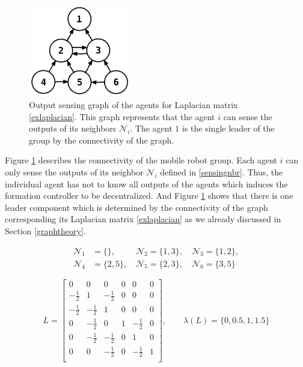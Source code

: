\documentclass[11pt, a4paper, oneside, openany, reqno]{book}
\theoremstyle{definition}
\theoremstyle{remark}
\numberwithin{equation}{chapter} %
\newcommand{\NBR}{\mathcal{N}}
\begin{document}
\begin{figure}[htp]
	\centering
	\includegraphics[width=0.40\textwidth]{laplacian.png}
	\caption{Output sensing graph of the agents for Laplacian matrix \eqref{exlaplacian}.
	This graph represents that the agent $ i $ can sense the outputs of its neighbors $ \NBR_i $.
	The agent $ 1 $ is the single leader of the group by the connectivity of the graph.}
	\label{connect}
\end{figure}

Figure \ref{connect} describes the connectivity of the mobile robot group.
Each agent $ i $ can only sense the outputs of its neighbor $ \NBR_i $ defined in \eqref{sensingnbr}.
Thus, the individual agent has not to know all outputs of the agents 
which induces the formation controller to be decentralized.
And Figure \ref{connect} shows that there is one leader component which is determined
by the connectivity of the graph corresponding its Laplacian matrix \eqref{exlaplacian}
as we already discussed in Section \ref{graphtheory}.

\begin{equation}\begin{split}\label{sensingnbr}
	\NBR_1 &= \lbrace \rbrace, \quad\quad\;\,
	\NBR_2 = \lbrace1, 3 \rbrace, \quad \NBR_3 = \lbrace 1, 2\rbrace,\\
	\NBR_4 &= \lbrace 2, 5\rbrace, \quad	
	\NBR_5 = \lbrace 2, 3\rbrace, \quad	\NBR_6 = \lbrace 3, 5\rbrace
\end{split}\end{equation}

\begin{equation}\label{exlaplacian}
	L=\left[ \begin{array}{cccccc } 
	0 & 0 & 0 & 0 & 0 & 0 \\
	-\frac{1}{2} & 1 & -\frac{1}{2} & 0 & 0 & 0 \\
	-\frac{1}{2} & -\frac{1}{2} & 1 & 0 & 0 & 0 \\
	0 & -\frac{1}{2} & 0 & 1 & -\frac{1}{2} & 0 \\
	0 & -\frac{1}{2} & -\frac{1}{2} & 0 & 1 & 0 \\
	0 & 0 & -\frac{1}{2} & 0 & -\frac{1}{2} & 1 \\		
	\end{array} \right],\qquad
	\lambda(L)=\lbrace0, 0.5, 1, 1.5  \rbrace
\end{equation}
\end{document}
